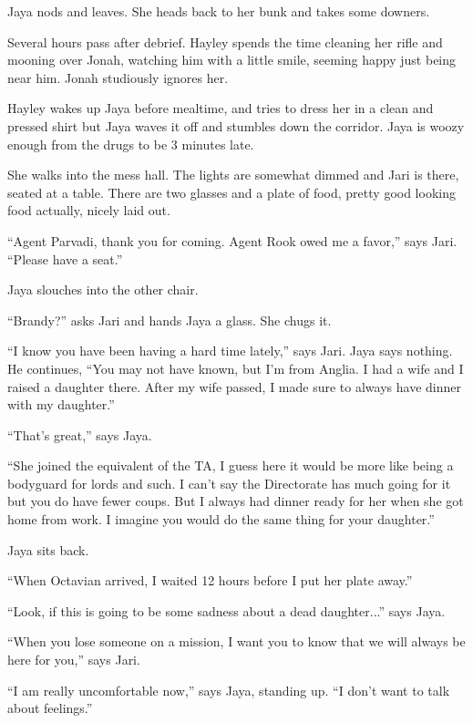 Jaya nods and leaves.  She heads back to her bunk and takes some downers.



Several hours pass after debrief.  Hayley spends the time cleaning her rifle and mooning over Jonah, watching him with a little smile, seeming happy just being near him.  Jonah studiously ignores her.





Hayley wakes up Jaya before mealtime, and tries to dress her in a clean and pressed shirt but Jaya waves it off and stumbles down the corridor.  Jaya is woozy enough from the drugs to be 3 minutes late.



She walks into the mess hall.  The lights are somewhat dimmed and Jari is there, seated at a table.  There are two glasses and a plate of food, pretty good looking food actually, nicely laid out.

``Agent Parvadi, thank you for coming.  Agent Rook owed me a favor,'' says Jari.  ``Please have a seat.''

Jaya slouches into the other chair.

``Brandy?'' asks Jari and hands Jaya a glass. She chugs it.

``I know you have been having a hard time lately,'' says Jari.   Jaya says nothing.  He continues, ``You may not have known, but I'm from Anglia.  I had a wife and I raised a daughter there.  After my wife passed, I made sure to always have dinner with my daughter.''

``That's great,'' says Jaya.

``She joined the equivalent of the TA, I guess here it would be more like being a bodyguard for lords and such.  I can't say the Directorate has much going for it but you do have fewer coups.  But I always had dinner ready for her when she got home from work.  I imagine you would do the same thing for your daughter.''

Jaya sits back.

``When Octavian arrived, I waited 12 hours before I put her plate away.''

``Look, if this is going to be some sadness about a dead daughter...'' says Jaya.

``When you lose someone on a mission, I want you to know that we will always be here for you,'' says Jari.

``I am really uncomfortable now,'' says Jaya, standing up.  ``I don't want to talk about feelings.''


